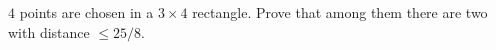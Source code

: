 $4$ points are chosen in a $3 \times 4$ rectangle. Prove that among them there are two with distance $\leq 25/8$.
